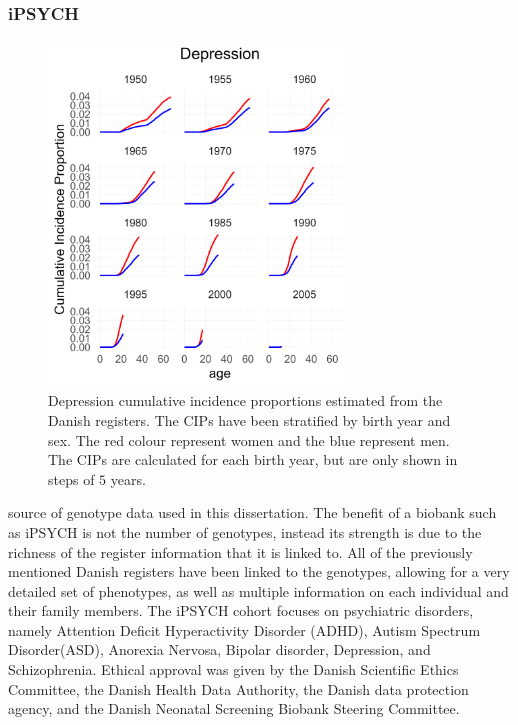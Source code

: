 \subsubsection{iPSYCH}
\begin{figure}
	\includegraphics[width=8cm]{methods/prevalencePlot_DEP.png}
	\caption[Cumulative incidence proportions from the Danish 
	Registers]{Depression cumulative incidence proportions estimated from the 
		Danish registers. The CIPs have been stratified by birth year and sex. The 
		red colour represent women and the blue represent men. The CIPs are 
		calculated for each birth year, but are only shown in steps of $ 
		5 $ years.}
	\label{fig:CIP_DEP}
\end{figure}
source of genotype data used in this dissertation. The benefit of a biobank such as iPSYCH is not the number of genotypes, instead its strength is due to the richness of the register information that it is linked to. All of the previously mentioned Danish registers have been linked to the genotypes, allowing for a very detailed set of phenotypes, as well as multiple information on each individual and their family members. The iPSYCH cohort focuses on psychiatric disorders, namely Attention Deficit Hyperactivity Disorder (ADHD), Autism Spectrum Disorder(ASD), Anorexia Nervosa, Bipolar disorder, Depression, and Schizophrenia\cite{pedersen2018ipsych2012}. Ethical approval was given by the Danish Scientific Ethics Committee, the Danish Health Data Authority, the Danish data protection agency, and the Danish Neonatal Screening Biobank Steering Committee.



